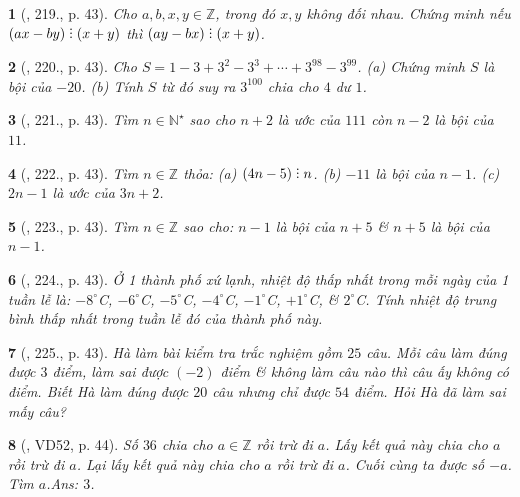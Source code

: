 \documentclass{article}
\newtheorem{baitoan}{}
\DeclareRobustCommand{\divby}{%
	\mathrel{\vbox{\baselineskip.65ex\lineskiplimit0pt\hbox{.}\hbox{.}\hbox{.}}}%
}
\begin{document}
\begin{baitoan}[\cite{Tuyen_Toan_6}, 219., p. 43]
	Cho $a,b,x,y\in\mathbb{Z}$, trong đó $x,y$ không đối nhau. Chứng minh nếu $(ax - by)\divby(x + y)$  thì $(ay - bx)\divby(x + y)$.
\end{baitoan}

\begin{baitoan}[\cite{Tuyen_Toan_6}, 220., p. 43]
	Cho $S = 1 - 3 + 3^2 - 3^3 + \cdots + 3^{98} - 3^{99}$. (a) Chứng minh $S$ là bội của $-20$. (b) Tính $S$ từ đó suy ra $3^{100}$ chia cho $4$ dư $1$.
\end{baitoan}

\begin{baitoan}[\cite{Tuyen_Toan_6}, 221., p. 43]
	Tìm $n\in\mathbb{N}^\star$ sao cho $n + 2$ là ước của $111$ còn $n - 2$ là bội của $11$.
\end{baitoan}

\begin{baitoan}[\cite{Tuyen_Toan_6}, 222., p. 43]
	Tìm $n\in\mathbb{Z}$ thỏa: (a) $(4n - 5)\divby n$. (b) $-11$ là bội của $n - 1$. (c) $2n - 1$ là ước của $3n + 2$.
\end{baitoan}

\begin{baitoan}[\cite{Tuyen_Toan_6}, 223., p. 43]
	Tìm $n\in\mathbb{Z}$ sao cho: $n - 1$ là bội của $n + 5$ \& $n + 5$ là bội của $n - 1$.
\end{baitoan}

\begin{baitoan}[\cite{Tuyen_Toan_6}, 224., p. 43]
	Ở 1 thành phố xứ lạnh, nhiệt độ thấp nhất trong mỗi ngày của 1 tuần lễ là: $-8^\circ$C, $-6^\circ$C, $-5^\circ$C, $-4^\circ$C, $-1^\circ$C, $+1^\circ$C, \& $2^\circ$C. Tính nhiệt độ trung bình thấp nhất trong tuần lễ đó của thành phố này. 
\end{baitoan}

\begin{baitoan}[\cite{Tuyen_Toan_6}, 225., p. 43]
	Hà làm bài kiểm tra trắc nghiệm gồm $25$ câu. Mỗi câu làm đúng được $3$ điểm, làm sai được $(-2)$ điểm \& không làm câu nào thì câu ấy không có điểm. Biết Hà làm đúng được $20$ câu nhưng chỉ được $54$ điểm. Hỏi Hà đã làm sai mấy câu?
\end{baitoan}

\begin{baitoan}[\cite{Binh_Toan_6_tap_1}, VD52, p. 44]
	Số $36$ chia cho $a\in\mathbb{Z}$ rồi trừ đi $a$. Lấy kết quả này chia cho $a$ rồi trừ đi $a$. Lại lấy kết quả này chia cho $a$ rồi trừ đi $a$. Cuối cùng ta được số $-a$. Tìm $a$.\hfill{\sf Ans:} $3$.
\end{baitoan}
\end{document}
